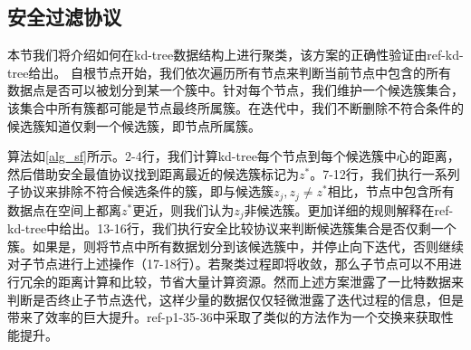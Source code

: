 \subsection{安全过滤协议}
本节我们将介绍如何在kd-tree数据结构上进行聚类，该方案的正确性验证由ref-kd-tree给出。
自根节点开始，我们依次遍历所有节点来判断当前节点中包含的所有数据点是否可以被划分到某一个簇中。针对每个节点，我们维护一个候选簇集合，该集合中所有簇都可能是节点最终所属簇。在迭代中，我们不断删除不符合条件的候选簇知道仅剩一个候选簇，即节点所属簇。

算法如\ref{alg_sf}所示。2-4行，我们计算kd-tree每个节点到每个候选簇中心的距离，然后借助安全最值协议找到距离最近的候选簇标记为$z^*$。7-12行，我们执行一系列子协议来排除不符合候选条件的簇，即与候选簇$z_j,z_j\neq z^*$相比，节点中包含所有数据点在空间上都离$z^*$更近，则我们认为$z_j$非候选簇。更加详细的规则解释在ref-kd-tree中给出。13-16行，我们执行安全比较协议来判断候选簇集合是否仅剩一个簇。如果是，则将节点中所有数据划分到该候选簇中，并停止向下迭代，否则继续对子节点进行上述操作（17-18行）。若聚类过程即将收敛，那么子节点可以不用进行冗余的距离计算和比较，节省大量计算资源。然而上述方案泄露了一比特数据来判断是否终止子节点迭代，这样少量的数据仅仅轻微泄露了迭代过程的信息，但是带来了效率的巨大提升。ref-p1-35-36中采取了类似的方法作为一个交换来获取性能提升。

